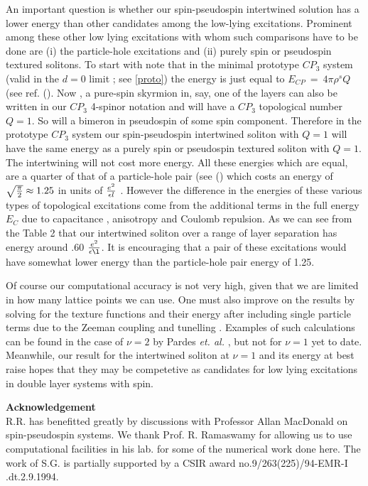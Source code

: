 An important question is whether our spin-pseudospin intertwined solution
has a lower energy than other candidates among the low-lying
excitations. Prominent among these other low lying excitations
with whom such comparisons have to be done are (i) the
particle-hole excitations and (ii) purely spin or pseudospin
textured solitons. To start with note that in the minimal
prototype $CP_{3}$ system (valid in the $d=0$ limit ; see \ref{proto})
the energy is just equal to $ E_{CP} \ = \ 4\pi \rho^{s}Q \ $ (see ref.
(\cite{Raj}). Now , a pure-spin skyrmion in, say, one of
the layers can also be written in our $CP_3$ 4-spinor notation and
will have a $CP_3$ topological number $Q =1$. So
will a bimeron in pseudospin of some spin component. Therefore in the
prototype $CP_{3}$ system our spin-pseudospin intertwined soliton with 
$Q=1$ will have the same energy as a purely spin or pseudospin
textured soliton with $Q=1$. The intertwining will not cost more energy. 
All these energies which are equal, 
are a quarter of that of a particle-hole pair
(see (\cite{Arov}) which costs an energy of $\sqrt{{\pi \over 2}} \approx 1.25$ in units of ${e^2 \over \epsilon l}$ .
However the difference in the energies of these various types of
topological excitations come from the additional terms in the
full energy $E_{C}$ due to capacitance , anisotropy and Coulomb repulsion.
As we can see from the Table 2 that 
our intertwined soliton over
a range of layer separation has energy around .60 $\frac{e^{2}}{\epsilon  \l}$. 
It is encouraging
that a pair of these excitations would have somewhat lower energy than the 
particle-hole pair energy of 1.25. 

Of course our computational accuracy is not very high, given that we are 
limited in how many lattice points we can use. One must also improve 
on the results by solving for the 
texture functions and their energy after including 
single particle terms due to the Zeeman coupling 
and tunelling . Examples of such calculations can be found
in the case of $\nu =2$ by Pardes {\sl et. al.} \cite{Pard}
, but not for $\nu =1$ yet to date. Meanwhile, our result for 
the intertwined soliton at $\nu = 1$ and its energy 
at best raise hopes that they may be competetive as candidates for low 
lying excitations in double layer systems with spin.

\vspace{1.0 cm}

{\bf Acknowledgement}\\
R.R. has benefitted greatly by discussions with Professor Allan MacDonald on
spin-pseudospin systems. We thank Prof. R. Ramaswamy for allowing
us to use computational facilities in his lab. for some of the numerical work
done here. The work of S.G. is partially supported by a
CSIR award no.9/263(225)/94-EMR-I .dt.2.9.1994.

